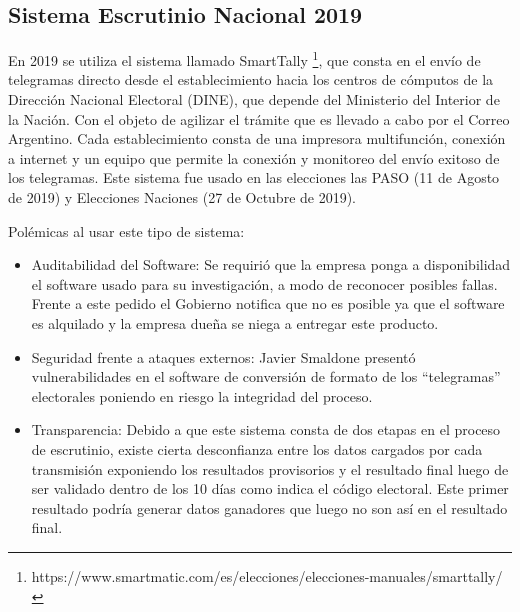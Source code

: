 \subsection{Sistema Escrutinio Nacional 2019}
En 2019 se utiliza el sistema llamado SmartTally \footnote{https://www.smartmatic.com/es/elecciones/elecciones-manuales/smarttally/}, que consta en el envío de telegramas directo desde el establecimiento hacia los centros de cómputos de la Dirección Nacional Electoral (DINE), que depende del Ministerio del Interior de la Nación. Con el objeto de agilizar el trámite que es llevado a cabo por el Correo Argentino. Cada establecimiento consta de una impresora multifunción, conexión a internet y un equipo que permite la conexión y monitoreo del envío exitoso de los telegramas. \newline
Este sistema fue usado en las elecciones las PASO (11 de Agosto de 2019) y Elecciones Naciones (27 de Octubre de 2019).

Polémicas al usar este tipo de sistema:
\begin{itemize}
    \item Auditabilidad del Software: Se requirió que la empresa ponga a disponibilidad el software usado para su investigación, a modo de reconocer posibles fallas. Frente a este pedido el Gobierno notifica que no es posible ya que el software es alquilado y la empresa dueña se niega a entregar este producto.\cite{auditabilidadSmartmatic}
    \item Seguridad frente a ataques externos: Javier Smaldone presentó vulnerabilidades en el software de conversión de formato de los ``telegramas'' electorales poniendo en riesgo la integridad del proceso. \cite{seguridadSmartmatic}
    \item Transparencia: Debido a que este sistema consta de dos etapas en el proceso de escrutinio, existe cierta desconfianza entre los datos cargados por cada transmisión exponiendo los resultados provisorios y el resultado final luego de ser validado dentro de los 10 días como indica el código electoral. Este primer resultado podría generar datos ganadores que luego no son así en el resultado final. \cite{rnEscrutinioProvisorio}
\end{itemize}



